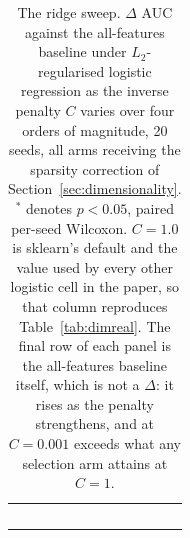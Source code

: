 \begin{table}[htbp]
\begin{tabular}{lrrrrrr}
$$    \hline
    \end{tabular}
    \caption{The ridge sweep. $\Delta$ AUC against the all-features baseline under $L_2$-regularised logistic regression as the inverse penalty $C$ varies over four orders of magnitude, 20 seeds, all arms receiving the sparsity correction of Section~\ref{sec:dimensionality}. $^{*}$ denotes $p < 0.05$, paired per-seed Wilcoxon. $C = 1.0$ is sklearn's default and the value used by every other logistic cell in the paper, so that column reproduces Table~\ref{tab:dimreal}. The final row of each panel is the all-features baseline itself, which is not a $\Delta$: it rises as the penalty strengthens, and at $C = 0.001$ exceeds what any selection arm attains at $C = 1$.}
    \label{tab:ridgesweep}
\end{table}
